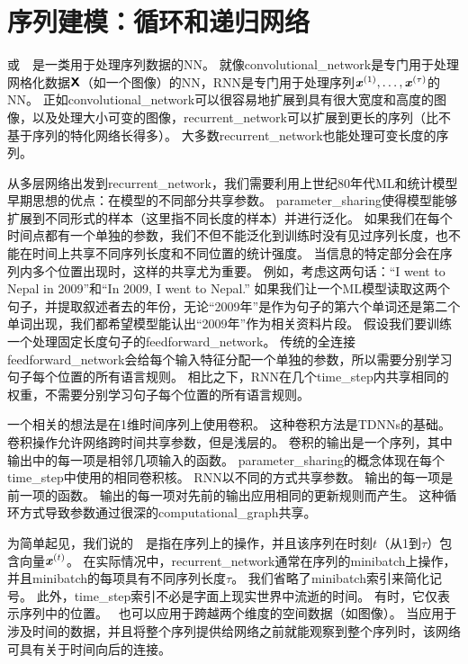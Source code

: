\chapter{序列建模：循环和递归网络}
\label{chap:sequence_modeling_recurrent_and_recursive_nets}
或~~\citep{RHW}是一类用于处理序列数据的\gls{NN}。
就像\gls{convolutional_network}是专门用于处理网格化数据$\textsf{\textbf{X}}$（如一个图像）的\gls{NN}，\gls{RNN}是专门用于处理序列$\boldsymbol{\mathit{x}}^{(1)}, \dots, \boldsymbol{\mathit{x}}^{(\tau)}$的\gls{NN}。
正如\gls{convolutional_network}可以很容易地扩展到具有很大宽度和高度的图像，以及处理大小可变的图像，\gls{recurrent_network}可以扩展到更长的序列（比不基于序列的特化网络长得多）。
大多数\gls{recurrent_network}也能处理可变长度的序列。 

从多层网络出发到\gls{recurrent_network}，我们需要利用上世纪80年代\gls{ML}和统计模型早期思想的优点：在模型的不同部分共享参数。
\gls{parameter_sharing}使得模型能够扩展到不同形式的样本（这里指不同长度的样本）并进行泛化。
如果我们在每个时间点都有一个单独的参数，我们不但不能泛化到训练时没有见过序列长度，也不能在时间上共享不同序列长度和不同位置的统计强度。
当信息的特定部分会在序列内多个位置出现时，这样的共享尤为重要。
例如，考虑这两句话：``I went to Nepal in 2009''和``In 2009, I went to Nepal.'' 
如果我们让一个\gls{ML}模型读取这两个句子，并提取叙述者去的年份，无论``2009年''是作为句子的第六个单词还是第二个单词出现，我们都希望模型能认出``2009年''作为相关资料片段。
假设我们要训练一个处理固定长度句子的\gls{feedforward_network}。
传统的全连接\gls{feedforward_network}会给每个输入特征分配一个单独的参数，所以需要分别学习句子每个位置的所有语言规则。
相比之下，\gls{RNN}在几个\gls{time_step}内共享相同的权重，不需要分别学习句子每个位置的所有语言规则。


一个相关的想法是在1维时间序列上使用卷积。
这种卷积方法是\gls{TDNNs}的基础\citep{Lang+Hinton88,Waibel89b,lang1990time}。
卷积操作允许网络跨时间共享参数，但是浅层的。
卷积的输出是一个序列，其中输出中的每一项是相邻几项输入的函数。
\gls{parameter_sharing}的概念体现在每个\gls{time_step}中使用的相同卷积核。
\gls{RNN}以不同的方式共享参数。
输出的每一项是前一项的函数。
输出的每一项对先前的输出应用相同的更新规则而产生。
这种循环方式导致参数通过很深的\gls{computational_graph}共享。

为简单起见，我们说的~~是指在序列上的操作，并且该序列在时刻$t$（从1到$\tau$）包含向量$\boldsymbol{\mathit{x}}^{(t)}$。
在实际情况中，\gls{recurrent_network}通常在序列的\gls{minibatch}上操作，并且\gls{minibatch}的每项具有不同序列长度$\tau$。
我们省略了\gls{minibatch}索引来简化记号。
此外，\gls{time_step}索引不必是字面上现实世界中流逝的时间。
有时，它仅表示序列中的位置。
~也可以应用于跨越两个维度的空间数据（如图像）。
当应用于涉及时间的数据，并且将整个序列提供给网络之前就能观察到整个序列时，该网络可具有关于时间向后的连接。


